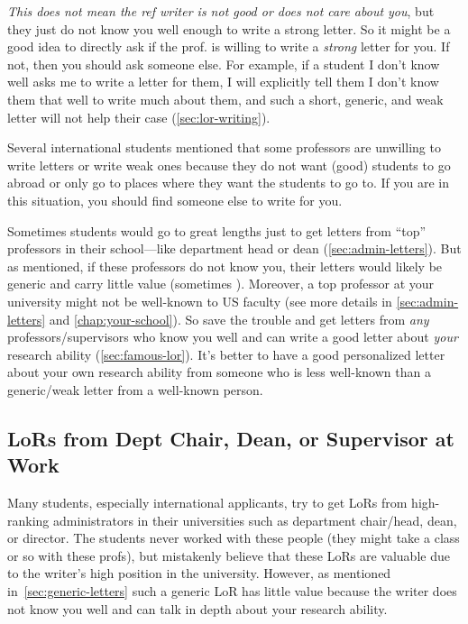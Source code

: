 \documentclass[oneside,11pt]{book}
\newenvironment{warningbox}[1][]{
  \small
  \begin{marker}[\faChessKing{}]
    {\textbf{#1}}
  }{
  \end{marker}
}
\newcommand{\red}[1]{{\color{red}{#1}}}
\begin{document}
  \emph{This does not mean the ref writer is not good or does not care about you}, but they just do not know you well enough to write a strong letter.
  So it might be a good idea to directly ask if the prof. is willing to write a \emph{strong} letter for you. If not, then you should ask someone else.  For example, if a student I don't know well asks me to write a letter for them, I will explicitly tell them I don't know them that well to write much about them, and such a short, generic, and weak letter will not help their case (\autoref{sec:lor-writing}).
  
  
  \begin{warningbox}
  Several international students mentioned that some professors are unwilling to write letters or write weak ones because they do not want (good) students to go abroad or only go to places where they want the students to go to. If you are in this situation, you should find someone else to write for you.
  \tcblower
  
  Sometimes students would go to great lengths just to get letters from ``top'' professors in their school---like department head or dean (\autoref{sec:admin-letters}). But as mentioned, if these professors do not know you, their letters would likely be generic and carry little value (sometimes \red{red flags}). Moreover, a top professor at your university might not be well-known to US faculty (see more details in \autoref{sec:admin-letters} and \autoref{chap:your-school}). So save the trouble and get letters from \emph{any} professors/supervisors who know you well and can write a good letter about \emph{your} research ability (\autoref{sec:famous-lor}). It's better to have a good personalized letter about your own research ability from someone who is less well-known than a generic/weak letter from a well-known person.
  \end{warningbox}

  

\subsection{LoRs from Dept Chair, Dean, or Supervisor at Work}\label{sec:admin-letters}

Many students, especially international applicants, try to get LoRs from high-ranking administrators in their universities such as department chair/head, dean, or director. The students never worked with these people (they might take a class or so with these profs), but mistakenly believe that these LoRs are valuable due to the writer's high position in the university.
However, as mentioned in~\autoref{sec:generic-letters} such a generic LoR has little value because the writer does not know you well and can talk in depth about your research ability. 
  
\end{document}
